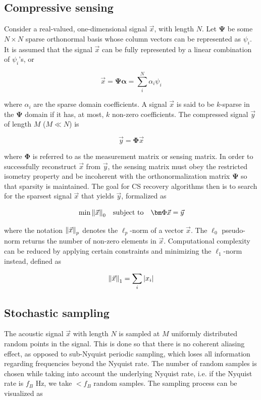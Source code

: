 \documentclass[10pt,a4paper,twoside]{article}
\begin{document}
\subsection{Compressive sensing}\label{ssec:CS}
Consider a real-valued, one-dimensional signal $\vec{x}$, with length $N$. Let $\bm\Psi$ be some $N \times N$ sparse orthonormal basis whose column vectors can be represented as $\psi_i$. It is assumed that the signal $\vec{x}$ can be fully represented by a linear combination of $\psi_i$'s, or

\begin{equation}\label{eq:sparserep}
	\vec{x} = \bm\Psi\bm\alpha = \sum_i^N \alpha_i \psi_i
\end{equation}

where $\alpha_i$ are the sparse domain coefficients. A signal $\vec{x}$ is said to be $k$-sparse in the $\bm\Psi$ domain if it has, at most, $k$ non-zero coefficients. The compressed signal $\vec{y}$ of length $M$ ($M \ll N$) is

\begin{equation}\label{eq:compressedsig}
	\vec{y} = \bm\Phi\vec{x}
\end{equation}

where $\bm\Phi$ is referred to as the measurement matrix or sensing matrix. In order to successfully reconstruct $\vec{x}$ from $\vec{y}$, the sensing matrix must obey the restricted isometry property and be incoherent with the orthonormalization matrix $\bm\Psi$ so that sparsity is maintained. The goal for CS recovery algorithms then is to search for the sparsest signal $\vec{x}$ that yields $\vec{y}$, formalized as

\begin{equation}\label{eq:minimize}
	\min \norm{\vec{x}}_0 \quad \textrm{subject to} \quad \bm\Phi\vec{x} = \vec{y}
\end{equation}

where the notation $\norm{\vec{x}}_p$ denotes the $\ell_p$-norm of a vector $\vec{x}$. The $\ell_0$ pseudo-norm returns the number of non-zero elements in $\vec{x}$. Computational complexity can be reduced by applying certain constraints and minimizing the $\ell_1$-norm instead, defined as

\begin{equation}\label{eq:l1norm}
	\norm{\vec{x}}_1 = \sum_i \abs{x_i}
\end{equation}

\subsection{Stochastic sampling}\label{ssec:subsample}
The acoustic signal $\vec{x}$ with length $N$ is sampled at $M$ uniformly distributed random points in the signal. This is done so that there is no coherent aliasing effect, as opposed to sub-Nyquist periodic sampling, which loses all information regarding frequencies beyond the Nyquist rate. The number of random samples is chosen while taking into account the underlying Nyquist rate, i.e. if the Nyquist rate is $f_B$ Hz, we take $< f_B$ random samples. The sampling process can be visualized as
\end{document}
